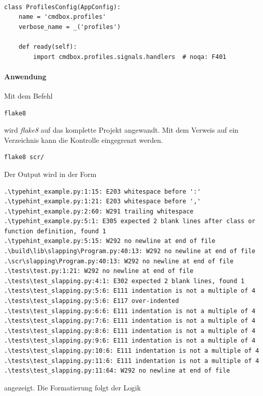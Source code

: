 \begin{lstlisting}[style=python]

class ProfilesConfig(AppConfig):
    name = 'cmdbox.profiles'
    verbose_name = _('profiles')

    def ready(self):
        import cmdbox.profiles.signals.handlers  # noqa: F401
\end{lstlisting}

\paragraph{Anwendung}
Mit dem Befehl 
\begin{lstlisting}[style=CMD]
flake8
\end{lstlisting}

wird \textit{flake8} auf das komplette Projekt angewandt. Mit dem Verweis auf ein Verzeichnis kann die Kontrolle eingegrenzt werden. 

\begin{lstlisting}[style=CMD]
flake8 scr/
\end{lstlisting}

Der Output wird in der Form

\begin{lstlisting}[language={}]
.\typehint_example.py:1:15: E203 whitespace before ':'
.\typehint_example.py:1:21: E203 whitespace before ','
.\typehint_example.py:2:60: W291 trailing whitespace
.\typehint_example.py:5:1: E305 expected 2 blank lines after class or function definition, found 1
.\typehint_example.py:5:15: W292 no newline at end of file
.\build\lib\slapping\Program.py:40:13: W292 no newline at end of file
.\scr\slapping\Program.py:40:13: W292 no newline at end of file
.\tests\test.py:1:21: W292 no newline at end of file
.\tests\test_slapping.py:4:1: E302 expected 2 blank lines, found 1
.\tests\test_slapping.py:5:6: E111 indentation is not a multiple of 4
.\tests\test_slapping.py:5:6: E117 over-indented
.\tests\test_slapping.py:6:6: E111 indentation is not a multiple of 4
.\tests\test_slapping.py:7:6: E111 indentation is not a multiple of 4
.\tests\test_slapping.py:8:6: E111 indentation is not a multiple of 4
.\tests\test_slapping.py:9:6: E111 indentation is not a multiple of 4
.\tests\test_slapping.py:10:6: E111 indentation is not a multiple of 4
.\tests\test_slapping.py:11:6: E111 indentation is not a multiple of 4
.\tests\test_slapping.py:11:64: W292 no newline at end of file
\end{lstlisting}

angezeigt. Die Formatierung folgt der Logik

